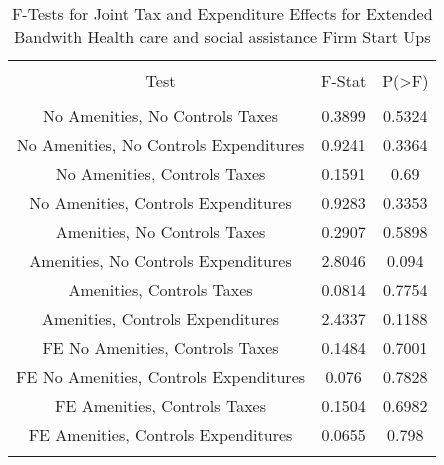 
\begin{table}[!htbp] \centering 
  \caption{F-Tests for Joint Tax and Expenditure Effects for Extended Bandwith Health care and social assistance Firm Start Ups} 
  \label{62Ftests} 
\begin{tabular}{@{\extracolsep{5pt}} ccc} 
\\[-1.8ex]\hline 
\hline \\[-1.8ex] 
Test & F-Stat & P(\textgreater F) \\ 
\hline \\[-1.8ex] 
No Amenities, No Controls Taxes & 0.3899 & 0.5324 \\ 
No Amenities, No Controls Expenditures & 0.9241 & 0.3364 \\ 
No Amenities, Controls Taxes & 0.1591 & 0.69 \\ 
No Amenities, Controls Expenditures & 0.9283 & 0.3353 \\ 
Amenities, No Controls Taxes & 0.2907 & 0.5898 \\ 
Amenities, No Controls Expenditures & 2.8046 & 0.094 \\ 
Amenities, Controls Taxes & 0.0814 & 0.7754 \\ 
Amenities, Controls Expenditures & 2.4337 & 0.1188 \\ 
FE No Amenities, Controls Taxes & 0.1484 & 0.7001 \\ 
FE No Amenities, Controls Expenditures & 0.076 & 0.7828 \\ 
FE Amenities, Controls Taxes & 0.1504 & 0.6982 \\ 
FE Amenities, Controls Expenditures & 0.0655 & 0.798 \\ 
\hline \\[-1.8ex] 
\end{tabular} 
\end{table} 
